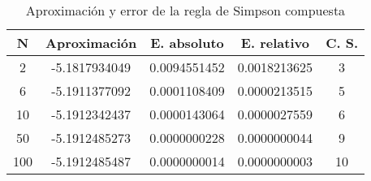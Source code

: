 \begin{table}[H]
  \begin{center}
    \begin{tabular}{|c|c|c|c|c|} \hline 
      \textbf{N} & \textbf{Aproximaci\'on} & \textbf{E. absoluto} & \textbf{E. relativo} & \textbf{C. S.}\\ 
      \hline
      2 & -5.1817934049 & 0.0094551452 & 0.0018213625 & 3
      \\
      \hline
      6 & -5.1911377092 & 0.0001108409 & 0.0000213515 & 5
      \\
      \hline
      10 & -5.1912342437 & 0.0000143064 & 0.0000027559 & 6
      \\
      \hline
      50 & -5.1912485273 & 0.0000000228 & 0.0000000044 & 9
      \\
      \hline
      100 & -5.1912485487 & 0.0000000014 & 0.0000000003 & 10
      \\
      \hline
    \end{tabular}
  \end{center}
  \caption{Aproximaci\'on y error de la regla de Simpson compuesta}
  \label{tab:4}
\end{table}

